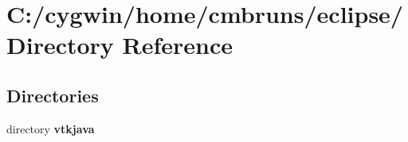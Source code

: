 \section{C:/cygwin/home/cmbruns/eclipse/ Directory Reference}
\label{dir_000003}
\subsection*{Directories}
\begin{CompactItemize}
\item 
directory {\bf vtkjava}
\end{CompactItemize}
